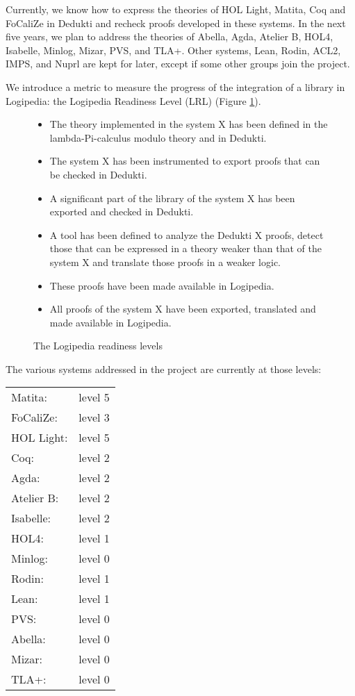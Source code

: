 Currently, we know how to express the theories of {\sc HOL Light},
{\sc Matita}, {\sc Coq} and {\sc FoCaliZe} in {\sc Dedukti} and recheck proofs
developed in these systems. In the next five years, we plan to address
the theories of {\sc Abella}, {\sc Agda}, {\sc Atelier B},
{\sc HOL4}, {\sc Isabelle}, {\sc Minlog}, {\sc Mizar},
{\sc PVS}, and {\sc TLA+}. Other systems, {\sc Lean}, {\sc Rodin}, {\sc ACL2},
{\sc IMPS}, and {\sc Nuprl} are kept for later, except if some other
groups join the project.

We introduce a metric to measure the progress of the
integration of a library in Logipedia: the Logipedia Readiness Level (LRL) (Figure \ref{lrl}).

\begin{figure}[ht]
\begin{itemize}
\item[LRL level 1:]
The theory implemented in the system X has been defined in
the lambda-Pi-calculus modulo theory and in Dedukti.

\item[LRL level 2:]
The system X has been instrumented to export proofs that
can be checked in Dedukti.

\item[LRL level 3:]
A significant part of the library of the system X has been exported and checked in Dedukti.

\item[LRL level 4:]
A tool has been defined to analyze the Dedukti X proofs,
detect those that can be expressed in a theory weaker than that of the
system X and translate those proofs in a weaker logic.

\item[LRL level 5:]
These proofs have been made available in Logipedia.

\item[LRL level 6:]
All proofs of the system X have been exported, translated
and made available in Logipedia.
\end{itemize}
\caption{The Logipedia readiness levels \label{lrl}}
\end{figure}

The various systems addressed in the project are currently at those levels:

\begin{tabular}{ll}
Matita:& level 5\\
FoCaliZe:& level 3\\
HOL Light:& level 5\\
Coq:& level 2\\
Agda:& level 2\\
Atelier B:& level 2\\
Isabelle:& level 2\\
HOL4:& level 1\\
Minlog:& level 0\\
Rodin:& level 1\\
Lean:& level 1\\
PVS:& level 0\\
Abella:& level 0\\
Mizar:& level 0\\
TLA+:& level 0
\end{tabular}

